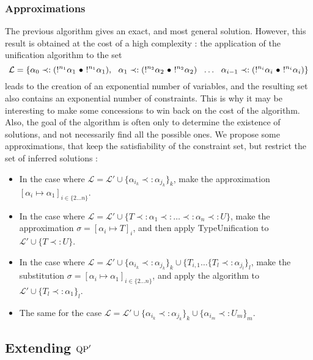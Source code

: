 \subsubsection{Approximations}

The previous algorithm gives an exact, and most general solution. However, this result is obtained at the cost of a high complexity :
the application of the unification algorithm to the set
{ \footnotesize
	$$\mathcal{L} = \{\alpha_0 \prec: (!^{n_1}\alpha_1 ~\bullet~ !^{n_1}\alpha_1), ~~ 
	\alpha_1 \prec: (!^{n_2}\alpha_2 ~\bullet~ !^{n_2}\alpha_2) ~~ \dots ~~ \alpha_{i-1} \prec: (!^{n_i}\alpha_i ~\bullet~ !^{n_i}\alpha_{i}) \}$$ }
leads to the creation of an exponential number of variables, and the resulting set also contains an exponential number of
constraints.
This is why it may be interesting to make some concessions to win back on the cost of the algorithm. Also, the goal of the algorithm is
often only to determine the existence of solutions, and not necessarily find all the possible ones.
We propose some approximations, that keep the satisfiability of the constraint set, but restrict the set of inferred solutions :
	
\begin{itemize}
	\item In the case where $\mathcal{L} = \mathcal{L'} \cup \{\alpha_{i_k} \prec: \alpha_{j_k} \}_k$,
		make the approximation ${[\alpha_i \mapsto \alpha_1]_{i \in \{2 \dots n\}}}$.
		
	\item In the case where $\mathcal{L} = \mathcal{L'} \cup \{T \prec: \alpha_1 \prec: \dots \prec: \alpha_n \prec: U\}$, make the
		approximation $\sigma = [\alpha_i \mapsto T]_i$, and then apply TypeUnification to $\mathcal{L'} \cup \{ T \prec: U \}$.
		
	\item In the case where $\mathcal{L} = \mathcal{L'} \cup \{\alpha_{i_k} \prec: \alpha_{j_k}\}_k \cup
		\{T_{i, 1} \dots \{T_l \prec: \alpha_{j_l} \}_l$, make the substitution $\sigma = {[\alpha_i \mapsto \alpha_1]_{i \in \{2 \dots n\}}}$,
		and apply the algorithm to $\mathcal{L'} \cup \{T_l \prec: \alpha_1\}_l$.
		
	\item The same for the case $\mathcal{L} = \mathcal{L'} \cup \{\alpha_{i_k} \prec: \alpha_{j_k}\}_k \cup \{\alpha_{i_m} \prec: U_m\}_m$.
\end{itemize}

\subsection{Extending ${\rm QP}'$}

